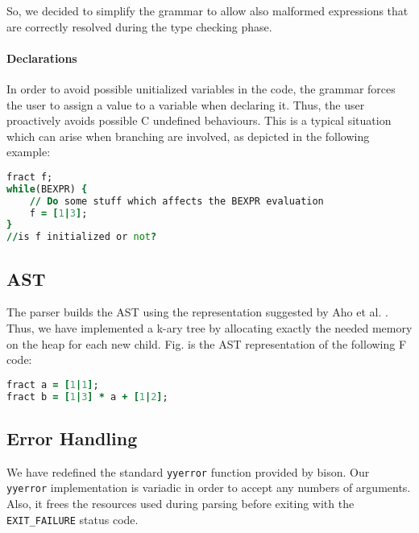 So, we decided to simplify the grammar to allow also malformed expressions that
are correctly resolved during the type checking phase.


\paragraph{Declarations}

In order to avoid possible unitialized variables in the code, the grammar
forces the user to assign a value to a variable when declaring it.
Thus, the user proactively avoids possible C undefined behaviours.
This is a typical situation which can arise
when branching are involved, as depicted in the following example:
\begin{lstlisting}[language=F,caption={Example of possible uninitialized 
variable},captionpos=b,label=f-code0]
fract f;
while(BEXPR) {
    // Do some stuff which affects the BEXPR evaluation
    f = [1|3];
}
//is f initialized or not?
\end{lstlisting}

\subsection{AST}
The parser builds the AST using the representation suggested by Aho et al. 
\cite{dragonbook}. Thus, we have implemented a k-ary
tree by allocating exactly the needed memory on the heap for each new child. 
Fig. is the AST representation of the following F code:
\begin{lstlisting}[language=F,caption={Example of F code},captionpos=b,label=f-code1]
fract a = [1|1];
fract b = [1|3] * a + [1|2];
\end{lstlisting}

\subsection{Error Handling}
We have redefined the standard \verb|yyerror| function provided by bison.
Our \verb|yyerror| implementation is variadic in order to accept any numbers of
arguments. Also, it frees the resources used during parsing before exiting with
the \verb|EXIT_FAILURE| \cite{glibc-online} status code.
